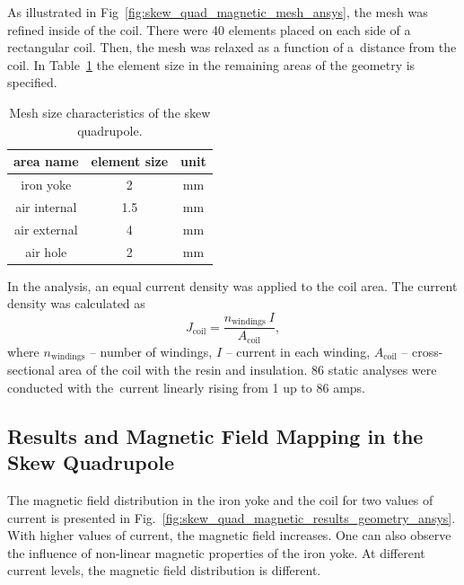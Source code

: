 As illustrated in Fig~\ref{fig:skew_quad_magnetic_mesh_ansys}, the mesh was refined inside of the coil. There were 40 elements placed on each side of a rectangular coil. Then, the mesh was relaxed as a function of a~distance from the coil. In Table~\ref{table:mesh_characteristics_magnetic_ansys} the element size in the remaining
areas of the geometry is specified.

\begin{table}[H]
    \caption{Mesh size characteristics of the skew quadrupole.} 
    \vspace{-1.em} 
    \fontsize{10}{10}
    \selectfont 
    \renewcommand{\arraystretch}{1.5}
    \begin{center}
        \begin{tabular}{ ccc } 
        \hline
        area name & element size & unit \\
        \hline
        iron yoke & 2 & mm \\
        air internal & 1.5 & mm \\
        air external & 4 & mm \\
        air hole & 2 & mm \\
        \hline 
        \end{tabular}
    \end{center}  
     \label{table:mesh_characteristics_magnetic_ansys} 
\end{table}

In the analysis, an equal current density was applied to the coil area. The current density was calculated as
\begin{equation}
    J_\text{coil} = \frac{n_\text{windings}~I}{A_\text{coil}},
\end{equation}
where $n_\text{windings}$ -- number of windings, $I$ -- current in each winding, $A_\text{coil}$ -- cross-sectional area of the coil with the resin and insulation. 86 static analyses were conducted with the~current linearly rising from 1 up to 86 amps. 

\subsection{Results and Magnetic Field Mapping in the Skew Quadrupole}

The magnetic field distribution in the iron yoke and the coil for two values of current is presented in Fig.~\ref{fig:skew_quad_magnetic_results_geometry_ansys}. With higher values of current, the magnetic field increases. One can also observe the influence of non-linear magnetic properties of the iron yoke. At different current levels, the magnetic field distribution is different.

